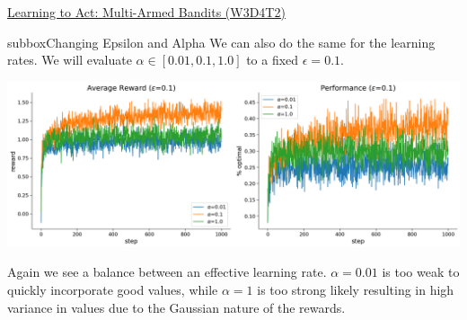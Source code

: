 \begin{textbox}{\href{https://compneuro.neuromatch.io/tutorials/W3D4_ReinforcementLearning/student/W3D4_Tutorial2.html}{Learning to Act: Multi-Armed Bandits (W3D4T2)} }
\begin{subbox}{subbox}{Changing Epsilon and Alpha}
We can also do the same for the learning rates. We will evaluate $\alpha \in [0.01, 0.1, 1.0]$ to a fixed $\epsilon=0.1$.

\begin{center}
    
\includegraphics[scale=0.15]{Figures/RL/RL_Figure13.png}
\end{center}
Again we see a balance between an effective learning rate. $\alpha=0.01$ is too weak to quickly incorporate good values, while $\alpha=1$ is too strong likely resulting in high variance in values due to the Gaussian nature of the rewards.

\end{subbox}
\end{textbox}
\newpage
